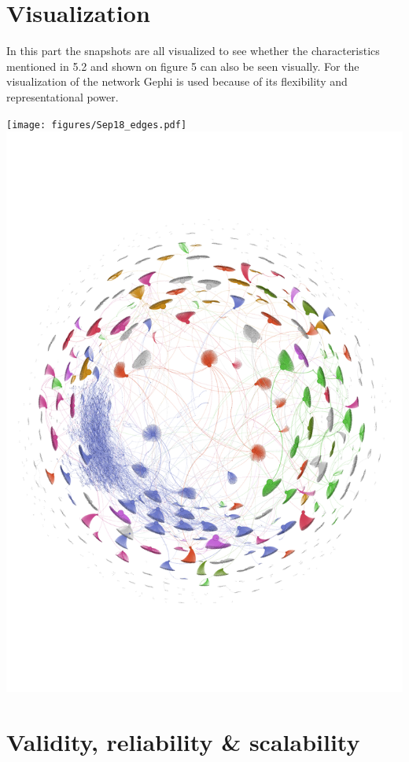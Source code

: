 \documentclass[10pt,a4paper]{article}
\newenvironment{Figure}
  {\par\medskip\noindent\minipage{\linewidth}}
  {\endminipage\par\medskip}
\begin{document}
\begin{multicols}{2}
\section{Visualization} 
In this part the snapshots are all visualized to see whether the characteristics mentioned in 5.2 and shown on figure 5 can also be seen visually. 
For the visualization of the network Gephi is used because of its flexibility and representational power. 

\begin{Figure}
\centering
\texttt{[image: figures/Sep18\_edges.pdf]}
\includegraphics[scale=0.45]{figures/March21_edges.pdf}
\label{clusters}
\end{Figure}



\section{Validity, reliability \& scalability}


\end{multicols}
\end{document}
